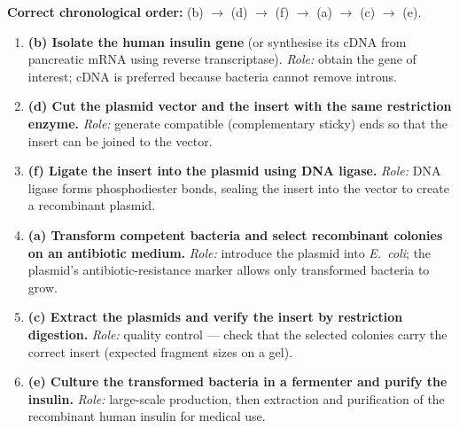 \documentclass[11pt]{article}
\newcommand{\cle}[1]{{\popxbold\color{popdark}#1}}
\begin{document}
\begin{corrige}
\textbf{Correct chronological order:} (b) $\rightarrow$ (d) $\rightarrow$ (f) $\rightarrow$ (a) $\rightarrow$ (c) $\rightarrow$ (e).
\begin{enumerate}
\item \textbf{(b) Isolate the human insulin gene} (or synthesise its cDNA from pancreatic mRNA using reverse transcriptase). \emph{Role:} obtain the gene of interest; cDNA is preferred because bacteria cannot remove introns.
\item \textbf{(d) Cut the plasmid vector and the insert with the same restriction enzyme.} \emph{Role:} generate compatible (complementary sticky) ends so that the insert can be joined to the vector.
\item \textbf{(f) Ligate the insert into the plasmid using DNA ligase.} \emph{Role:} DNA ligase forms phosphodiester bonds, sealing the insert into the vector to create a \cle{recombinant plasmid}.
\item \textbf{(a) Transform competent bacteria and select recombinant colonies on an antibiotic medium.} \emph{Role:} introduce the plasmid into \emph{E.~coli}; the plasmid's antibiotic-resistance marker allows only transformed bacteria to grow.
\item \textbf{(c) Extract the plasmids and verify the insert by restriction digestion.} \emph{Role:} quality control — check that the selected colonies carry the correct insert (expected fragment sizes on a gel).
\item \textbf{(e) Culture the transformed bacteria in a fermenter and purify the insulin.} \emph{Role:} large-scale production, then extraction and purification of the recombinant human insulin for medical use.
\end{enumerate}
\end{corrige}
\end{document}
